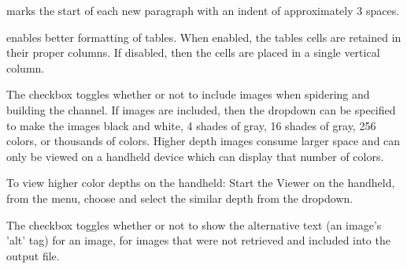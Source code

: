

 marks the start of 
each new paragraph with an indent of approximately 3 spaces. 

 enables better formatting of
tables. When enabled, the tables cells are retained in their proper columns.
If disabled, then the cells are placed in a single vertical column.


The  checkbox toggles whether or not to include
images when spidering and building the channel. If images are included, then
the  dropdown can be specified to make the images
black and white, 4 shades of gray, 16 shades of gray, 256 colors, or thousands
of colors. Higher depth images consume larger space and can only be viewed on a
handheld device which can display that number of colors.

\begin{basictip}
To view higher color depths on the handheld: Start the Viewer on
the handheld, from the menu, choose  and 
select the similar depth from the  dropdown.
\end{basictip}


The 
checkbox toggles whether or not to show the alternative text 
(an image's 'alt' tag) for an image, for images that were not retrieved and 
included into the output file. \notimplemented

